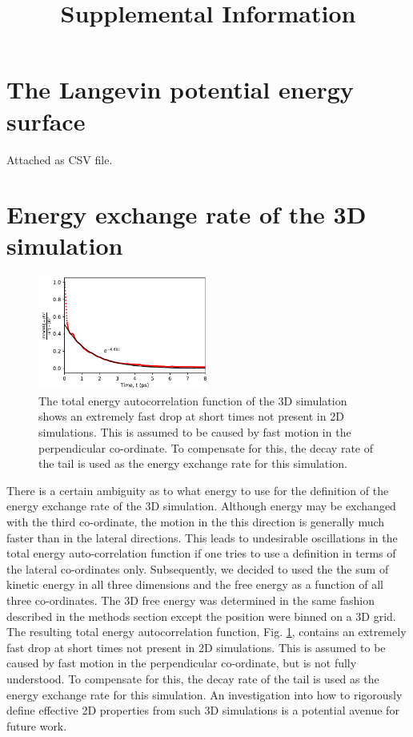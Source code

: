 \documentclass[7pt]{article}
\title{Supplemental Information}
\begin{document}
\maketitle
\tableofcontents

\section{The Langevin potential energy surface}

Attached as CSV file.

\section{Energy exchange rate of the 3D simulation}

\begin{figure}
	\centering
	\includegraphics[width=0.5\textwidth]{MD_e_auto}
	\caption{The total energy autocorrelation function of the 3D simulation shows an extremely fast drop at short times not present in 2D simulations. This is assumed to be caused by fast motion in the perpendicular co-ordinate. To compensate for this, the decay rate of the tail is used as the energy exchange rate for this simulation.} 
	\label{fig:MD_e_auto}
\end{figure}

There is a certain ambiguity as to what energy to use for the definition of the energy exchange rate of the 3D simulation. Although energy may be exchanged with the third co-ordinate, the motion in the this direction is generally much faster than in the lateral directions. This leads to undesirable oscillations in the total energy auto-correlation function if one tries to use a definition in terms of the lateral co-ordinates only. Subsequently, we decided to used the the sum of kinetic energy in all three dimensions and the free energy as a function of all three co-ordinates. The 3D free energy was determined in the same fashion described in the methods section except the position were binned on a 3D grid. The resulting total energy autocorrelation function, Fig. \ref{fig:MD_e_auto}, contains an extremely fast drop at short times not present in 2D simulations. This is assumed to be caused by fast motion in the perpendicular co-ordinate, but is not fully understood. To compensate for this, the decay rate of the tail is used as the energy exchange rate for this simulation. An investigation into how to rigorously define effective 2D properties from such 3D simulations is a potential avenue for future work.
\end{document}
